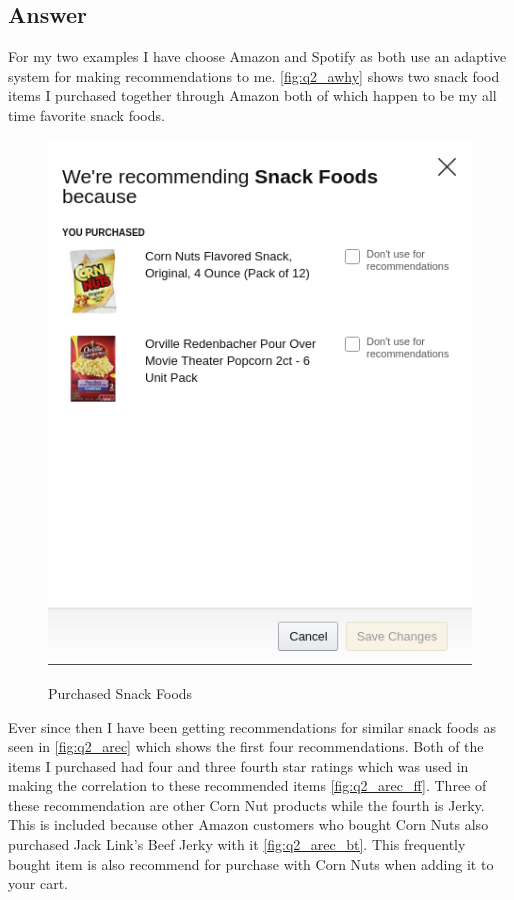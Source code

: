 \documentclass[11pt]{article}
\begin{document}
\subsection*{Answer} 
For my two examples I have choose Amazon and Spotify as both use an adaptive system for making recommendations to me.
\autoref{fig:q2_awhy} shows two snack food items I purchased together through Amazon both of which happen to be my all time favorite snack foods. 
\begin{figure}[H]
\centering
{}%
{\includegraphics[scale=.8]{whyAmazonRecommened.png}}
\caption{Purchased Snack Foods}
\label{fig:q2_awhy}
\end{figure}
\noindent Ever since then I have been getting recommendations for similar snack foods as seen in \autoref{fig:q2_arec} which shows the first four recommendations. Both of the items I purchased had four and three fourth star ratings which was used in making the correlation to these recommended items \autoref{fig:q2_arec_ff}. Three of these recommendation are other Corn Nut products while the fourth is Jerky. This is included because other Amazon customers who bought Corn Nuts also purchased Jack Link's Beef Jerky with it \autoref{fig:q2_arec_bt}. This frequently bought item is also recommend for purchase with Corn Nuts when adding it to your cart.
\end{document}

